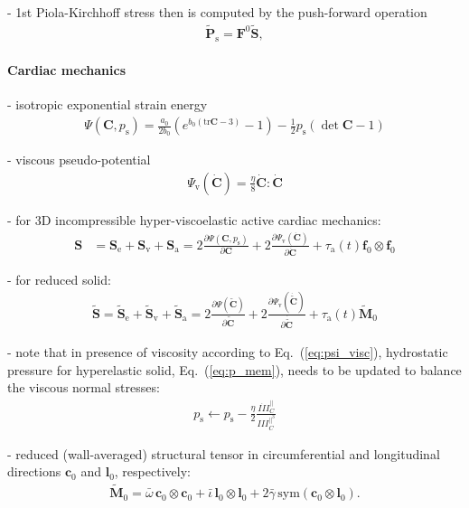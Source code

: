\documentclass[a4paper,12pt]{report}
\newcommand{\fS}{\text{s}}
\newcommand{\bs}[1]{\boldsymbol{#1}}
\newcommand{\ps}{p_{\fS}} %
\begin{document}
- 1st Piola-Kirchhoff stress then is computed by the push-forward operation
\begin{align}
    \tilde{\bs{P}}_{\fS} = \bs{F}^{0}\tilde{\bs{S}}, \label{eq:P_membrane_stress}
\end{align}


\paragraph{Cardiac mechanics}

- isotropic exponential strain energy \cite{demiray1972}
\begin{align}
    \mathit{\Psi}(\bs{C},\ps) = \frac{a_0}{2b_0}\left(e^{b_0(\mathrm{tr}\bs{C} - 3)} - 1\right) -\frac{1}{2}\ps(\det{\bs{C}} - 1) \label{eq:psi_pass}
\end{align}

- viscous pseudo-potential \cite{chapelle2012}
\begin{align}
\mathit{\Psi}_{\mathrm{v}}(\dot{\bs{C}}) = \frac{\eta}{8}\dot{\bs{C}}:\dot{\bs{C}}\label{eq:psi_visc}
\end{align}

- for 3D incompressible hyper-viscoelastic active cardiac mechanics:
\begin{align}
\bs{S}&=\bs{S}_{\mathrm{e}} + \bs{S}_{\mathrm{v}} + \bs{S}_{\mathrm{a}} = 2\frac{\partial\mathit{\Psi}(\bs{C},\ps)}{\partial\bs{C}} + 2\frac{\partial\mathit{\Psi}_{\mathrm{v}}(\dot{\bs{C}})}{\partial\dot{\bs{C}}} + \tau_{\mathrm{a}}(t)\bs{f}_{0}\otimes\bs{f}_{0}
\end{align}

- for reduced solid:
\begin{align}
\tilde{\bs{S}}=\tilde{\bs{S}}_{\mathrm{e}} + \tilde{\bs{S}}_{\mathrm{v}} + \tilde{\bs{S}}_{\mathrm{a}} = 2\frac{\partial\mathit{\Psi}(\tilde{\bs{C}})}{\partial\tilde{\bs{C}}} + 2\frac{\partial\mathit{\Psi}_{\mathrm{v}}(\dot{\tilde{\bs{C}}})}{\partial\dot{\tilde{\bs{C}}}} + \tau_{\mathrm{a}}(t)\tilde{\bs{M}}_{0}
\end{align}

- note that in presence of viscosity according to Eq.~(\ref{eq:psi_visc}), hydrostatic pressure for hyperelastic solid, Eq.~(\ref{eq:p_mem}), needs to be updated to balance the viscous normal stresses:
\begin{align}
\ps \leftarrow \ps - \frac{\eta}{2}\frac{\dot{I\!\!I\!\!I}_{C}^{||}}{I\!\!I\!\!I_{C}^{||^3}}
\end{align}


- reduced (wall-averaged) structural tensor in circumferential and longitudinal directions $\bs{c}_{0}$ and $\bs{l}_{0}$, respectively:
\begin{align}
\tilde{\bs{M}}_{0} = \bar{\omega}\, \bs{c}_{0}\otimes\bs{c}_{0} + \bar{\iota}\,\bs{l}_{0}\otimes\bs{l}_{0} + 2\bar{\gamma}\,\mathrm{sym}(\bs{c}_{0}\otimes\bs{l}_{0}). \label{eq:M0}
\end{align}
\end{document}
